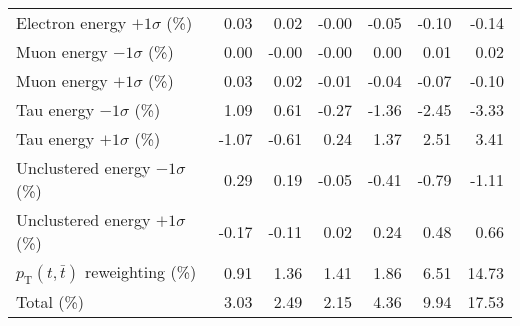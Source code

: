 \begin{table}[htbp]
{\begin{tabular}{lrrrrrr}
Electron energy $+1\sigma$ (\%) & 0.03 & 0.02 & -0.00 & -0.05 & -0.10 & -0.14 \\ 
Muon energy $-1\sigma$ (\%) & 0.00 & -0.00 & -0.00 & 0.00 & 0.01 & 0.02 \\ 
Muon energy $+1\sigma$ (\%) & 0.03 & 0.02 & -0.01 & -0.04 & -0.07 & -0.10 \\ 
Tau energy $-1\sigma$ (\%) & 1.09 & 0.61 & -0.27 & -1.36 & -2.45 & -3.33 \\ 
Tau energy $+1\sigma$ (\%) & -1.07 & -0.61 & 0.24 & 1.37 & 2.51 & 3.41 \\ 
Unclustered energy $-1\sigma$ (\%) & 0.29 & 0.19 & -0.05 & -0.41 & -0.79 & -1.11 \\ 
Unclustered energy $+1\sigma$ (\%) & -0.17 & -0.11 & 0.02 & 0.24 & 0.48 & 0.66 \\ 
$p_\mathrm{T}(t,\bar{t})$ reweighting (\%) & 0.91 & 1.36 & 1.41 & 1.86 & 6.51 & 14.73 \\ 
\hline 
Total (\%) & 3.03  & 2.49  & 2.15  & 4.36  & 9.94  & 17.53 \\ 
\hline 
\end{tabular}
}
\end{table}

